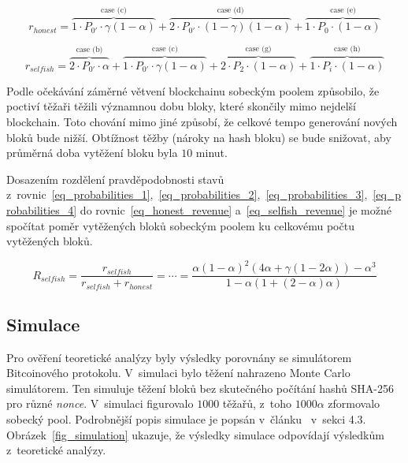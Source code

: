 \begin{equation}
    r_{honest} = \overbrace{1 \cdot P_{0'} \cdot \gamma (1 - \alpha)}^\text{case (c)} +  \overbrace{2 \cdot P_{0'} \cdot (1 - \gamma)(1 - \alpha)}^\text{case (d)} + \overbrace{1 \cdot P_0 \cdot (1 - \alpha)}^\text{case (e)}
    \label{eq_honest_revenue}
\end{equation}

\begin{equation}
    r_{selfish} = \overbrace{2 \cdot P_{0'} \cdot \alpha}^\text{case (b)} + \overbrace{1 \cdot P_{0'} \cdot \gamma (1 - \alpha)}^\text{case (c)} + \overbrace{2 \cdot P_2 \cdot (1 - \alpha)}^\text{case (g)} + \overbrace{1 \cdot P_i \cdot (1 - \alpha)}^\text{case (h)}
    \label{eq_selfish_revenue}
\end{equation}

Podle očekávání záměrné větvení blockchainu sobeckým poolem způsobilo, že poctiví těžaři těžili významnou dobu bloky, které skončily mimo nejdelší blockchain. Toto chování mimo jiné způsobí, že celkové tempo generování nových bloků bude nižší. Obtížnost těžby (nároky na hash bloku) se bude snižovat, aby průměrná doba vytěžení bloku byla $10$ minut.

Dosazením rozdělení pravděpodobnosti stavů z~rovnic~\ref{eq_probabilities_1},~\ref{eq_probabilities_2},~\ref{eq_probabilities_3},~\ref{eq_probabilities_4} do rovnic~\ref{eq_honest_revenue} a~\ref{eq_selfish_revenue} je možné spočítat poměr vytěžených bloků sobeckým poolem ku celkovému počtu vytěžených bloků.

\begin{equation}
    R_{selfish} = \frac{r_{selfish}}{r_{selfish} + r_{honest}} = \cdots = \frac{\alpha (1 - \alpha)^2 (4 \alpha + \gamma (1 - 2 \alpha)) - \alpha^3}{1 - \alpha (1 + (2 - \alpha) \alpha)}
    \label{eq_selfish_revenue_rate}
\end{equation}


\subsection{Simulace}
\label{sec_analyza_simulace}

Pro ověření teoretické analýzy byly výsledky porovnány se simulátorem Bitcoinového protokolu. V~simulaci bylo těžení nahrazeno Monte Carlo simulátorem. Ten simuluje těžení bloků bez skutečného počítání hashů SHA-256 pro různé \textit{nonce}. V~simulaci figurovalo $1000$ těžařů, z~toho $1000 \alpha$ zformovalo sobecký pool. Podrobnější popis simulace je popsán v~článku~\cite{bib_paper} v~sekci 4.3. Obrázek~\ref{fig_simulation} ukazuje, že výsledky simulace odpovídají výsledkům z~teoretické analýzy.

